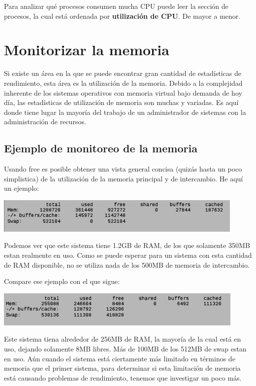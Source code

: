 \documentclass[12pt]{article}
\begin{document}
Para analizar qué procesos consumen mucha CPU puede leer 
la sección de procesos, la cual está ordenada por \textbf{utilización de CPU}. De mayor a menor.

\section*{Monitorizar la memoria}
Si existe un área en la que se puede encontrar gran cantidad de estadísticas de rendimiento, esta área es la utilización de la memoria. Debido a la complejidad inherente de los sistemas operativos con memoria virtual bajo demanda de hoy día, las estadísticas de utilización de memoria son muchas y variadas. Es aquí donde tiene lugar la mayoría del trabajo de un administrador de sistemas con la administración de recursos.


\subsection*{Ejemplo de monitoreo de la memoria}


Usando free es posible obtener una vista general concisa (quizás hasta un poco simplistica) de la utilización de la memoria principal y de intercambio. He aquí un ejemplo:

\begin{center}
 \includegraphics{free1.png}
\end{center}

      
Podemos ver que este sistema tiene 1.2GB de RAM, de los que solamente 350MB estan realmente en uso. Como se puede esperar para un sistema con esta cantidad de RAM disponible, no se utiliza nada de los 500MB de memoria de intercambio.

Compare ese ejemplo con el que sigue:

\begin{center}
 \includegraphics{free2.png}
\end{center}

      
Este sistema tiena alrededor de 256MB de RAM, la mayoría de la cual está en uso, dejando solamente 8MB libres. Más de 100MB de los 512MB de swap estan en uso. Aún cuando el sistema está ciertamente más limitado en términos de memoria que el primer sistema, para determinar si esta limitación de memoria está causando problemas de rendimiento, tenemos que investigar un poco más.
\end{document}
